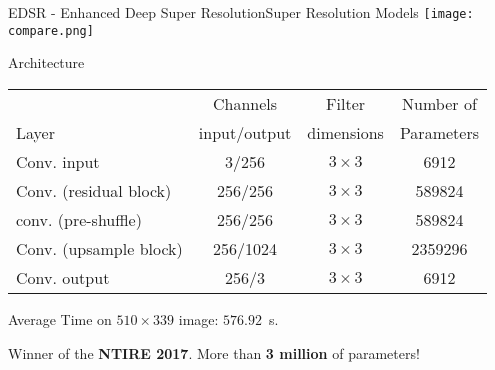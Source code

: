 \documentclass[10pt, technote, oribibl, unicode]{beamer}
\begin{document}
\begin{frame}{EDSR - Enhanced Deep Super Resolution}{Super Resolution Models}
  \centering
  \texttt{[image: compare.png]}


  \begin{alertblock}{Architecture}
    \scriptsize{
    \begin{tabular}{lccc}
      \hline \rowcolor{orange!20!white}
                               &  Channels     & Filter     & Number of    \\
      \rowcolor{orange!20!white}
      Layer                    & input/output  & dimensions & Parameters   \\
      \hline
      Conv. input              & 3/256      & $3\times3$   & 6912          \\
      Conv. (residual block)   & 256/256    & $3\times3$   & 589824        \\
      conv. (pre-shuffle)      & 256/256    & $3\times3$   & 589824        \\
      Conv. (upsample block)   & 256/1024   & $3\times3$   & 2359296       \\
      Conv. output             & 256/3      & $3\times3$   & 6912          \\
      \hline
    \end{tabular}
    }

    \vspace{0.5cm}
    \scriptsize{Average Time on $510\times339$ image: $576.92$~s.}

    \scriptsize{Winner of the \textbf{NTIRE 2017}. More than \textbf{3 million} of parameters!}
  \end{alertblock}

\end{frame}
\end{document}
